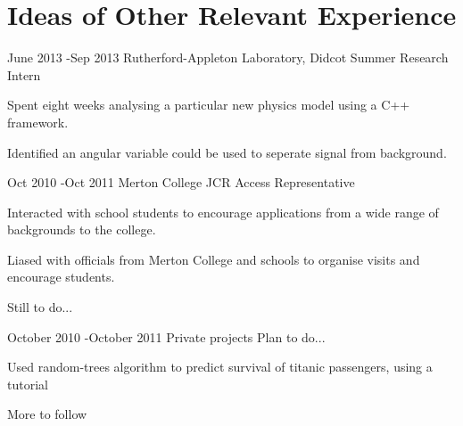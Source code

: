 \documentclass[10pt]{article} %
\begin{document}
\section{Ideas of Other Relevant Experience}

\job
{June 2013 -}{Sep 2013}
{Rutherford-Appleton Laboratory, Didcot}
{}
{Summer Research Intern}
{\begin{itemize-noindent}
  \item{Spent eight weeks analysing a particular new physics model using a C++ framework.}
  \item{Identified an angular variable could be used to seperate signal from background.}
\end{itemize-noindent}}

\job
{Oct 2010 -}{Oct 2011}
{Merton College JCR Access Representative}
{}
{}
{\begin{itemize-noindent}
  \item{Interacted with school students to encourage applications from a wide range of backgrounds to the college.}
  \item{Liased with officials from Merton College and schools to organise visits and encourage students.}
 \end{itemize-noindent}}

\vspace{10mm}
Still to do...
\vspace{10mm}


\job
{October 2010 -}{October 2011}
{Private projects}
{Plan to do...}
{}
{\begin{itemize-noindent}
  \item{Used random-trees algorithm to predict survival of titanic passengers, using a tutorial}
  \item{More to follow}
 \end{itemize-noindent}}
\end{document}
